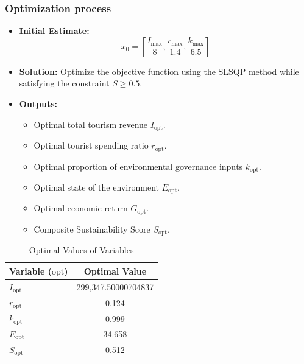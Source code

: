\documentclass[UTF8]{mcmthesis}
\begin{document}
        \subsubsection{Optimization process}

        \begin{itemize}
            \item \textbf{Initial Estimate:} 
            \[
            x_0 = \left[ \frac{I_{\text{max}}}{8}, \frac{r_{\text{max}}}{1.4}, \frac{k_{\text{max}}}{6.5} \right]
            \]
            \item \textbf{Solution:} Optimize the objective function using the SLSQP method while satisfying the constraint \( S \geq 0.5 \).
            \item \textbf{Outputs:}
            \begin{itemize}
                \item Optimal total tourism revenue  \( I_{\text{opt}} \).
                \item Optimal tourist spending ratio \( r_{\text{opt}} \).
                \item Optimal proportion of environmental governance inputs \( k_{\text{opt}} \).
                \item Optimal state of the environment \( E_{\text{opt}} \).
                \item Optimal economic return \( G_{\text{opt}} \).
                \item Composite Sustainability Score \( S_{\text{opt}} \).
            \end{itemize}
        \end{itemize}
        
        \begin{table}[htbp]
            \centering
            \caption{Optimal Values of Variables}
            \begin{tabular}{lc}
                \toprule
                \textbf{Variable (\( \text{opt} \))} & \textbf{Optimal Value} \\
                \midrule
                \( I_{\text{opt}} \) & 299,347.50000704837 \\
                \( r_{\text{opt}} \) & 0.124 \\
                \( k_{\text{opt}} \) & 0.999 \\
                \( E_{\text{opt}} \) & 34.658 \\
                \( S_{\text{opt}} \) & 0.512 \\
                \bottomrule
            \end{tabular}
            \label{tab:optimal_values}
        \end{table}
        
\end{document}
